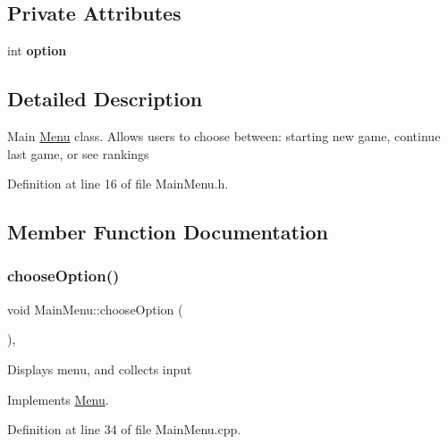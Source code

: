 \subsection*{Private Attributes}
\begin{DoxyCompactItemize}
\item 
\mbox{\label{classMainMenu_a11e5e68dfcccc2b802d628043fd1694c}} 
int {\bfseries option}
\end{DoxyCompactItemize}


\subsection{Detailed Description}
Main \hyperlink{classMenu}{Menu} class. Allows users to choose between\+: starting new game, continue last game, or see rankings 

Definition at line 16 of file Main\+Menu.\+h.



\subsection{Member Function Documentation}
\mbox{\label{classMainMenu_a21c41131a13a5149fe5859d1d670e20b}} 
\subsubsection{\texorpdfstring{choose\+Option()}{chooseOption()}}
{\footnotesize\ttfamily void Main\+Menu\+::choose\+Option (\begin{DoxyParamCaption}{ }\end{DoxyParamCaption})\hspace{0.3cm}{\ttfamily [override]}, {\ttfamily [virtual]}}

Displays menu, and collects input 

Implements \hyperlink{classMenu}{Menu}.



Definition at line 34 of file Main\+Menu.\+cpp.

\mbox{\label{classMainMenu_adfc425f06cd51c10d78521315ae9abd6}} 
